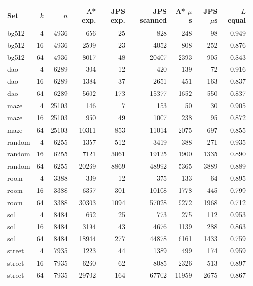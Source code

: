 \begin{tabular}{lr r rr r rr r}\toprule
Set & $k$ & $n$ & A* exp. & JPS exp. & JPS scanned & A* $\mu$s & JPS $\mu$s & $L$ equal\\\midrule
bg512 & 4 & 4936 & 656 & 25 & 828 & 248 & 98 & 0.949\\
bg512 & 16 & 4936 & 2599 & 23 & 4052 & 808 & 252 & 0.876\\
bg512 & 64 & 4936 & 8017 & 48 & 20407 & 2393 & 905 & 0.843\\
dao & 4 & 6289 & 304 & 12 & 420 & 139 & 72 & 0.916\\
dao & 16 & 6289 & 1384 & 37 & 2651 & 451 & 163 & 0.837\\
dao & 64 & 6289 & 5602 & 173 & 15377 & 1652 & 550 & 0.837\\
maze & 4 & 25103 & 146 & 7 & 153 & 50 & 30 & 0.905\\
maze & 16 & 25103 & 950 & 49 & 1007 & 238 & 95 & 0.872\\
maze & 64 & 25103 & 10311 & 853 & 11014 & 2075 & 697 & 0.855\\
random & 4 & 6255 & 1357 & 512 & 3419 & 388 & 271 & 0.935\\
random & 16 & 6255 & 7121 & 3061 & 19125 & 1900 & 1335 & 0.890\\
random & 64 & 6255 & 20269 & 8869 & 48992 & 5365 & 3889 & 0.889\\
room & 4 & 3388 & 339 & 12 & 375 & 133 & 64 & 0.895\\
room & 16 & 3388 & 6357 & 301 & 10108 & 1778 & 445 & 0.799\\
room & 64 & 3388 & 30303 & 1094 & 57028 & 9272 & 1968 & 0.712\\
sc1 & 4 & 8484 & 662 & 25 & 773 & 275 & 112 & 0.953\\
sc1 & 16 & 8484 & 3194 & 43 & 4676 & 1139 & 288 & 0.863\\
sc1 & 64 & 8484 & 18944 & 277 & 44878 & 6161 & 1433 & 0.759\\
street & 4 & 7935 & 1223 & 44 & 1389 & 499 & 174 & 0.959\\
street & 16 & 7935 & 6260 & 62 & 8085 & 2326 & 513 & 0.897\\
street & 64 & 7935 & 29702 & 164 & 67702 & 10959 & 2675 & 0.867\\
\bottomrule\end{tabular}
